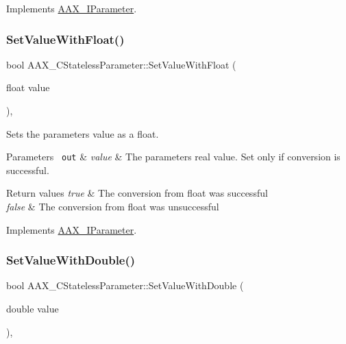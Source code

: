 Implements \mbox{\hyperlink{a01857_aa2b8cfdd30ff25e47c4c2a8609d1e06f}{A\+A\+X\+\_\+\+I\+Parameter}}.

\mbox{\label{a01541_aa44752ab96e44c0be7f2c2f9d84f71a1}} 
\subsubsection{\texorpdfstring{SetValueWithFloat()}{SetValueWithFloat()}}
{\footnotesize\ttfamily bool A\+A\+X\+\_\+\+C\+Stateless\+Parameter\+::\+Set\+Value\+With\+Float (\begin{DoxyParamCaption}\item[{float}]{value }\end{DoxyParamCaption})\hspace{0.3cm}{\ttfamily [inline]}, {\ttfamily [virtual]}}



Sets the parameter\textquotesingle{}s value as a float. 


\begin{DoxyParams}[1]{Parameters}
\mbox{\texttt{ out}}  & {\em value} & The parameter\textquotesingle{}s real value. Set only if conversion is successful.\\
\hline
\end{DoxyParams}

\begin{DoxyRetVals}{Return values}
{\em true} & The conversion from float was successful \\
\hline
{\em false} & The conversion from float was unsuccessful \\
\hline
\end{DoxyRetVals}


Implements \mbox{\hyperlink{a01857_a1d37b80bc3a9c4e53fc2c1684f47dfb7}{A\+A\+X\+\_\+\+I\+Parameter}}.

\mbox{\label{a01541_a0f9948eaa3600905fbe07c07276f49cc}} 
\subsubsection{\texorpdfstring{SetValueWithDouble()}{SetValueWithDouble()}}
{\footnotesize\ttfamily bool A\+A\+X\+\_\+\+C\+Stateless\+Parameter\+::\+Set\+Value\+With\+Double (\begin{DoxyParamCaption}\item[{double}]{value }\end{DoxyParamCaption})\hspace{0.3cm}{\ttfamily [inline]}, {\ttfamily [virtual]}}



